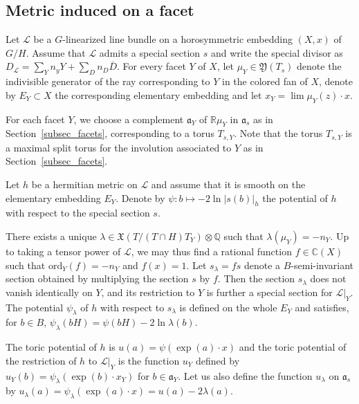 \documentclass{amsart}
\theoremstyle{definition}
\begin{document}
\subsection{Metric induced on a facet}

\label{subsec_metric_facet}

Let $\mathcal{L}$ be a $G$-linearized line bundle on a horosymmetric 
embedding $(X,x)$ of $G/H$. 
Assume that $\mathcal{L}$ admits a special section $s$ and write the 
special divisor as  
$D_{\mathcal{L}}=\sum_Yn_yY+\sum_Dn_D\overline{D}$.
For every facet $Y$ of $X$, let $\mu_Y\in \mathfrak{Y}(T_s)$ denote 
the indivisible generator of the ray corresponding to $Y$ in the 
colored fan of $X$, denote by $E_Y\subset X$ the corresponding 
elementary embedding and let $x_Y=\lim \mu_Y(z)\cdot x$.

For each facet $Y$, we choose a complement $\mathfrak{a}_Y$ of 
$\mathbb{R}\mu_Y$ in $\mathfrak{a}_s$ as in Section~\ref{subsec_facets}, 
corresponding to a torus $T_{s,Y}$. 
Note that the torus $T_{s,Y}$ is a maximal split torus for the 
involution associated to $Y$ as in Section~\ref{subsec_facets}. 

Let $h$ be a hermitian metric on $\mathcal{L}$ and assume that it is 
smooth on the elementary embedding $E_Y$. 
Denote by $\psi: b\mapsto -2\ln|s(b)|_h$ the potential of $h$ 
with respect to the special section $s$. 

There exists a unique $\lambda\in \mathfrak{X}(T/(T\cap H)T_Y)\otimes \mathbb{Q}$ 
such that $\lambda(\mu_Y)=-n_Y$. 
Up to taking a tensor power of $\mathcal{L}$, we may thus find 
a rational function $f\in \mathbb{C}(X)$ such that 
$\mathrm{ord}_Y(f)=-n_Y$ and $f(x)=1$.
Let $s_{\lambda}=fs$ denote a $B$-semi-invariant section obtained by multiplying 
the section $s$ by $f$.
Then the section $s_{\lambda}$ does not vanish identically on $Y$, 
and its restriction to $Y$ is further a special section for $\mathcal{L}|_Y$.
The potential $\psi_{\lambda}$ of $h$ with respect to $s_{\lambda}$ 
is defined on the whole $E_Y$ and satisfies, for $b\in B$, 
$\psi_{\lambda}(bH)=\psi(bH)-2\ln \lambda(b)$.

The toric potential of $h$ is 
$u(a)=\psi(\exp(a)\cdot x)$ 
and the toric potential of the restriction of $h$ to $\mathcal{L}|_Y$ is 
the function $u_Y$ defined by 
$u_Y(b)=\psi_{\lambda}(\exp(b)\cdot x_Y)$
for $b\in \mathfrak{a}_Y$.
Let us also define the function $u_{\lambda}$ on $\mathfrak{a}_s$ 
by 
$u_{\lambda}(a)=\psi_{\lambda}(\exp(a)\cdot x)=u(a)-2\lambda(a)$.
\end{document}

